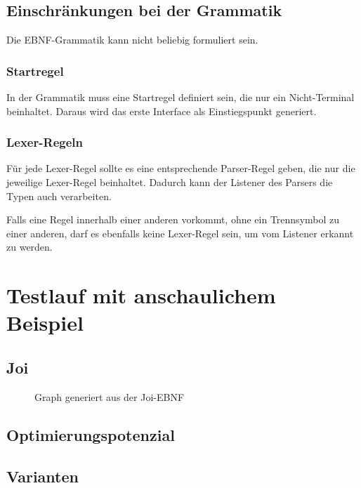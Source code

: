 \documentclass[../InterneDSLs.tex]{subfiles}
\begin{document}
\section{Einschränkungen bei der Grammatik}
Die EBNF-Grammatik kann nicht beliebig formuliert sein.

\subsection{Startregel}
In der Grammatik muss eine Startregel definiert sein, die nur ein Nicht-Terminal beinhaltet. Daraus wird das erste Interface als Einstiegspunkt generiert.

\subsection{Lexer-Regeln}
Für jede Lexer-Regel sollte es eine entsprechende Parser-Regel geben, die nur die jeweilige Lexer-Regel beinhaltet. Dadurch kann der Listener des Parsers die Typen auch verarbeiten.

Falls eine Regel innerhalb einer anderen vorkommt, ohne ein Trennsymbol zu einer anderen, darf es ebenfalls keine Lexer-Regel sein, um vom Listener erkannt zu werden.


\chapter{Testlauf mit anschaulichem Beispiel}\label{SEC:Example}

\section{Joi}
\begin{figure}[ht]
    
\end{figure}
\begin{figure}[ht]
\centering
\resizebox{0.5\linewidth}{!}{}
\caption{Graph generiert aus der Joi-EBNF}
\label{FIG:JoiGraph}
\end{figure}

\section{Optimierungspotenzial}


\section{Varianten}
\end{document}
